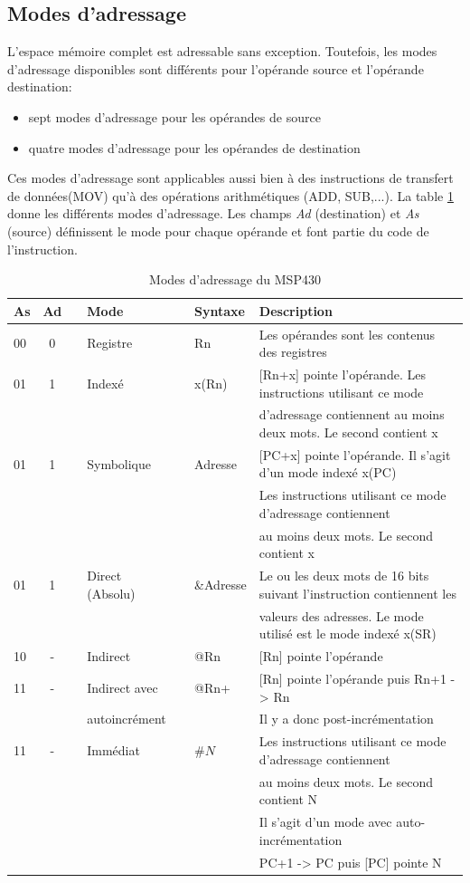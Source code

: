 \subsection{Modes d'adressage}
L'espace mémoire complet est adressable sans exception. Toutefois, les modes d'adressage disponibles sont différents pour l'opérande source et l'opérande destination:
\begin{itemize}[label=\textbullet,font=\small]
\item sept modes d'adressage pour les opérandes de source
\item quatre modes d'adressage pour les opérandes de destination
\end{itemize}

Ces modes d'adressage sont applicables aussi bien à des instructions de transfert de données(MOV) qu'à des opérations arithmétiques (ADD, SUB,...).
La table \ref{table:MSP430_Addr_Reg} donne les différents modes d'adressage. Les champs \textit{Ad} (destination) et \textit{As} (source) définissent le mode pour chaque opérande et font partie du code de l'instruction. 
\begin{table}[H]
\centering 
\begin{tabular}{l c l l l l l}
\hline\hline
As & Ad & & Mode & & Syntaxe & Description \\ %
\hline
00 & 0 & & Registre & & Rn & Les opérandes sont les contenus des registres  \\
01 & 1 & & Indexé & & x(Rn) & [Rn+x] pointe l'opérande. Les instructions utilisant ce mode\\
& & & & & & d'adressage contiennent au moins deux mots. Le second contient x \\
01 & 1 & & Symbolique & & Adresse & [PC+x] pointe l'opérande. Il s'agit d'un mode indexé x(PC)\\
& & & & & & Les instructions utilisant ce mode d'adressage contiennent\\
& & & & & &  au moins deux mots. Le second contient x \\
01 & 1 & & Direct (Absolu) & & \&Adresse & Le ou les deux mots de 16 bits suivant l'instruction contiennent les\\
& & & & & & valeurs des adresses. Le mode utilisé est le mode indexé x(SR) \\
10 & - & & Indirect & & @Rn & [Rn] pointe l'opérande \\
11 & - & & Indirect avec & & @Rn+ & [Rn] pointe l'opérande puis Rn+1 -> Rn\\
& & & autoincrément & & & Il y a donc post-incrémentation \\
11 & - & & Immédiat & & $\#N$ & Les instructions utilisant ce mode d'adressage contiennent\\
& & & & & & au moins deux mots. Le second contient N \\
& & & & & & Il s'agit d'un mode avec auto-incrémentation\\
& & & & & & PC+1 -> PC puis [PC] pointe N \\
\hline
\end{tabular}
\caption{Modes d'adressage du MSP430}
\label{table:MSP430_Addr_Reg}
\end{table}

